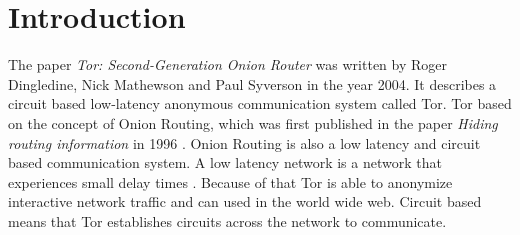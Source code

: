 
\section{Introduction}
The paper \textit{Tor: Second-Generation Onion Router} was written by Roger Dingledine, Nick Mathewson and Paul Syverson in the year 2004. 
It describes a circuit based low-latency anonymous communication system called Tor. 
Tor based on the concept of Onion Routing, which was first published in the paper \textit{Hiding routing information} in 1996 \cite{goldschlag1996hiding}. 
Onion Routing is also a low latency and circuit based communication system.
A low latency network is a network that experiences small delay times \cite{latency}.
Because of that Tor is able to anonymize interactive network traffic and can used in the world wide web. Circuit based means that Tor establishes  circuits across the network to communicate. 

